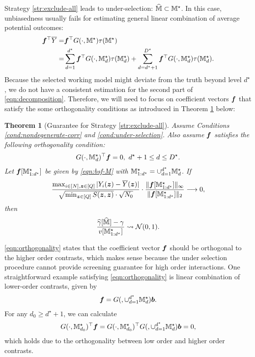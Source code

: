 \documentclass[12pt]{article}
\newtheorem{theorem}{Theorem}
\begin{document}
Strategy \ref{str:exclude-all} leads to under-selection: $\widehat{{\mathbb{M}}}\subset{{\mathbb{M}}}^\star$. In this case, unbiasedness usually fails for estimating general linear combination of average potential outcomes:
\begin{align}
    {\boldsymbol{f}}^\top \overline{Y} =& {\boldsymbol{f}}^\top G(\cdot,{\mathbb{M}}^\star)\tau({\mathbb{M}}^\star)\notag \\
    =&  \sum_{d=1}^{d^\star}{\boldsymbol{f}}^\top G(\cdot,{\mathbb{M}}^\star_d)\tau({\mathbb{M}}^\star_d) + \sum_{d=d^\star+1}^{D^\star} {\boldsymbol{f}}^\top G(\cdot,{\mathbb{M}}^\star_d)\tau({\mathbb{M}}^\star_d). \label{eqn:decomposition}
\end{align}
Because the selected working model might deviate from the truth beyond level $d^\star$, we do not have a consistent estimation for the second part of \eqref{eqn:decomposition}. Therefore, we will need to focus on  coefficient vectors ${\boldsymbol{f}}$ that satisfy the some orthogonality conditions as introduced in Theorem \ref{thm:strategy-I} below:
\begin{theorem}[Guarantee for Strategy \ref{str:exclude-all}]\label{thm:strategy-I}
Assume Conditions \ref{cond:nondegenerate-corr} and \ref{cond:under-selection}. Also assume ${\boldsymbol{f}}$ satisfies the following orthogonality condition: 
\begin{align}\label{eqn:orthogonality}
    G(\cdot, {\mathbb{M}}_d^{\star})^\top{\boldsymbol{f}} = 0, ~d^\star +1 \le d \le D^\star.
\end{align}
Let $ {{\boldsymbol{f}}}[{\mathbb{M}}^\star_{1:d^\star}]$ be given by \eqref{eqn:bsf-M} with ${\mathbb{M}}^\star_{1:d^\star} = \cup_{d=1}^{d^\star}{\mathbb{M}}^\star_d$. If 
\begin{align*}
    \frac{  \max_{i\in[N],{\boldsymbol{z}}\in[Q]}|Y_i({\boldsymbol{z}})-\overline{Y}({\boldsymbol{z}})|}{\sqrt{  \min_{{\boldsymbol{z}}\in[Q]} S({\boldsymbol{z}},{\boldsymbol{z}})}\cdot \sqrt{N_0}}\cdot  \frac{\|{{\boldsymbol{f}}}[{\mathbb{M}}^\star_{1:d^\star}]\|_\infty}{\|{{\boldsymbol{f}}}[{\mathbb{M}}^\star_{1:d^\star}]\|_2} \longrightarrow 0,
\end{align*}
then 
\begin{align*}
    \frac{{\widehat{\gamma}}[\widehat{{\mathbb{M}}}]-\gamma}{v[{\mathbb{M}}^\star_{1:d^\star}]} \rightsquigarrow {\mathcal{N}}(0,1).
\end{align*}

\end{theorem}

\eqref{eqn:orthogonality} states that the coefficient vector ${\boldsymbol{f}}$ should be orthogonal to the higher order contrasts, which makes sense because the under selection procedure cannot provide  screening guarantee for high order interactions. One straightforward example satisfying  \eqref{eqn:orthogonality} is linear combination of lower-order contrasts, given by
\begin{align*}
{\boldsymbol{f}} = G(,\cup_{d=1}^{d^\star}{\mathbb{M}}^\star_d) \boldsymbol{b}.
\end{align*}
For any $d_0\ge d^\star + 1$, we can calculate
\begin{align*}
    G(\cdot, {\mathbb{M}}_{d_0}^{\star})^\top{\boldsymbol{f}} = G(\cdot, {\mathbb{M}}_{d_0}^{\star})^\top G(,\cup_{d=1}^{d^\star}{\mathbb{M}}^\star_d) \boldsymbol{b} = 0,
\end{align*}
which holds due to the orthogonality between low order and higher order contrasts. 
\end{document}
